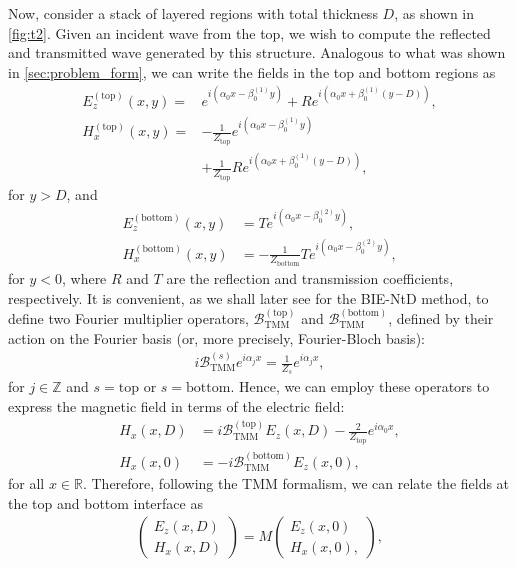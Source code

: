 \documentclass[reprint,amsmath,amssymb,
 aps]{revtex4-2}
\newcommand{\R}{\mathbb{R}}
\newcommand{\Z}{\mathbb{Z}}
\newcommand{\Bcal}{\mathcal{B}}
\begin{document}
Now, consider a stack of layered regions with total thickness $D$, as shown in \cref{fig:t2}. Given an incident wave from the top, we wish to compute the reflected and transmitted wave generated by this structure. Analogous to what was shown in \cref{sec:problem_form}, we can write the fields in the top and bottom regions as
\begin{align}
E_z^{(\text{top})}(x,y) =& e^{i(\alpha_0 x-\beta_0^{(1)}y)} + Re^{i(\alpha_0 x+\beta_0^{(1)}(y-D))},  \label{eq:tmm_etop}\\
H_x^{(\text{top})}(x,y) =& -\frac{1}{Z_\text{top}}e^{i(\alpha_0 x-\beta_0^{(1)}y)} \nonumber \\&+\frac{1}{Z_\text{top}}Re^{i(\alpha_0 x+\beta_0^{(1)}(y-D))} ,
\end{align}
for $y > D$, and 
\begin{align}
E_z^{(\text{bottom})}(x,y) &= Te^{i(\alpha_0 x-\beta_0^{(2)}y)},  \label{eq:tmm_ebottom}\\
H_x^{(\text{bottom})}(x,y) &= -\frac{1}{Z_\text{bottom}}Te^{i(\alpha_0 x-\beta_0^{(2)}y)} ,
\end{align}
for $y < 0$, where $R$ and $T$ are the reflection and transmission coefficients, respectively. It is convenient, as we shall later see for the BIE-NtD method, to define two Fourier multiplier operators, $\Bcal_\text{TMM}^{(\text{top})}$ and $\Bcal_\text{TMM}^{(\text{bottom})}$, defined by their action on the Fourier basis (or, more precisely, Fourier-Bloch basis):
\begin{align}
i\Bcal_\text{TMM}^{(s)}e^{i\alpha_j x} = \frac{1}{Z_{s}}e^{i\alpha_j x},
\end{align}
for $j\in\Z$ and $s=\text{top}$ or $s=\text{bottom}$. Hence, we can employ these operators to express the magnetic field in terms of the electric field:
\begin{align}
H_x(x,D) &= i\Bcal_\text{TMM}^{(\text{top})}E_z(x,D) - \frac{2}{Z_\text{top}}e^{i\alpha_0 x},\\
H_x(x,0) &= -i\Bcal_\text{TMM}^{(\text{bottom})}E_z(x,0),
\end{align}
for all $x\in\R$. Therefore, following the TMM formalism, we can relate the fields at the top and bottom interface as
\begin{align}
\begin{pmatrix}
E_z(x,D) \\
H_x(x,D) 
\end{pmatrix} 
= M
\begin{pmatrix}
E_z(x,0) \\
H_x(x,0),
\end{pmatrix},
\end{align}
\end{document}
